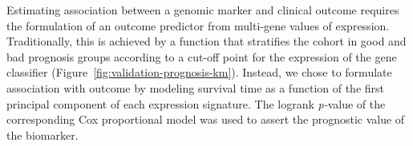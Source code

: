 Estimating association between a genomic marker and clinical outcome requires
the formulation of an outcome predictor from multi-gene values of expression.
Traditionally, this is achieved by a function that stratifies the cohort in good
and bad prognosis groups according to a cut-off point for the expression of the
gene classifier (Figure~\ref{fig:validation-prognosis-km}).  Instead, we chose
to formulate association with outcome by modeling survival time as a function of
the first principal component of each expression signature.  The logrank
\mbox{\emph{p-}value} of the corresponding Cox proportional model was used to
assert the prognostic value of the biomarker.

